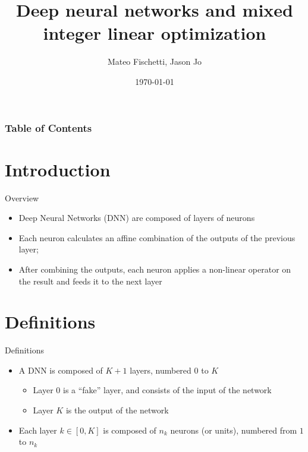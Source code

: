 \documentclass{beamer}
\title[DNN and MILP]{Deep neural networks and mixed integer linear optimization}
\author{Mateo Fischetti, Jason Jo}
\date{\today}
\begin{document}
\begin{frame}
\titlepage
\end{frame}

\begin{frame}
\frametitle{Table of Contents}
\tableofcontents
\end{frame}

\section{Introduction}
\begin{frame}{Overview}
  \begin{itemize}
  \item Deep Neural Networks (DNN) are composed of layers of neurons
  \item Each neuron calculates an affine combination of the outputs of the previous layer;
  \item After combining the outputs, each neuron applies a non-linear operator on the result and feeds it to the next layer
  \end{itemize}
\end{frame}

\section{Definitions}
\begin{frame}{Definitions}
  \begin{itemize}
  \item A DNN is composed of $K+1$ layers, numbered $0$ to $K$
    \begin{itemize}
    \item Layer $0$ is a ``fake'' layer, and consists of the input of the network
    \item Layer $K$ is the output of the network
    \end{itemize}
  \item Each layer $k \in [0, K]$ is composed of $n_k$ neurons (or units), numbered from $1$ to $n_k$
  \end{itemize}
\end{frame}
\end{document}
